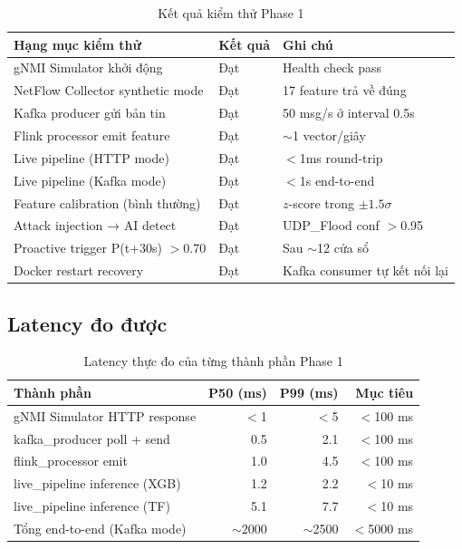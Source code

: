 \documentclass[12pt,a4paper]{article}
\begin{document}
\begin{table}[H]
\centering
\caption{Kết quả kiểm thử Phase 1}
\label{tab:phase1_results}
\begin{tabular}{p{6cm}lp{5cm}}
\toprule
\textbf{Hạng mục kiểm thử} & \textbf{Kết quả} & \textbf{Ghi chú} \\
\midrule
gNMI Simulator khởi động & Đạt & Health check pass \\
NetFlow Collector synthetic mode & Đạt & 17 feature trả về đúng \\
Kafka producer gửi bản tin & Đạt & 50 msg/s ở interval 0.5s \\
Flink processor emit feature & Đạt & $\sim$1 vector/giây \\
Live pipeline (HTTP mode) & Đạt & $<$1ms round-trip \\
Live pipeline (Kafka mode) & Đạt & $<$1s end-to-end \\
Feature calibration (bình thường) & Đạt & $z$-score trong $\pm1.5\sigma$ \\
Attack injection → AI detect & Đạt & UDP\_Flood conf $>$0.95 \\
Proactive trigger P(t+30s) $>$0.70 & Đạt & Sau $\sim$12 cửa sổ \\
Docker restart recovery & Đạt & Kafka consumer tự kết nối lại \\
\bottomrule
\end{tabular}
\end{table}

\subsection{Latency đo được}

\begin{table}[H]
\centering
\caption{Latency thực đo của từng thành phần Phase 1}
\label{tab:latency}
\begin{tabular}{lrrr}
\toprule
\textbf{Thành phần} & \textbf{P50 (ms)} & \textbf{P99 (ms)} & \textbf{Mục tiêu} \\
\midrule
gNMI Simulator HTTP response  &  $<$1  &  $<$5  & $<$100 ms \\
kafka\_producer poll + send    & 0.5   & 2.1    & $<$100 ms \\
flink\_processor emit          & 1.0   & 4.5    & $<$100 ms \\
live\_pipeline inference (XGB) & 1.2   & 2.2    & $<$10 ms \\
live\_pipeline inference (TF)  & 5.1   & 7.7    & $<$10 ms \\
Tổng end-to-end (Kafka mode)   & $\sim$2000 & $\sim$2500 & $<$5000 ms \\
\bottomrule
\end{tabular}
\end{table}
\end{document}

